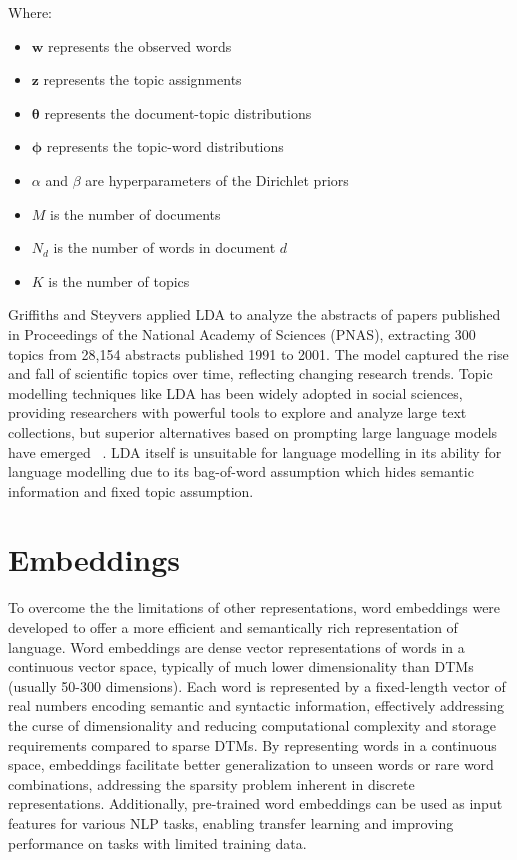 \documentclass[a4paper, oneside]{discothesis}
\begin{document}
Where:
\begin{itemize}
    \item $\mathbf{w}$ represents the observed words
    \item $\mathbf{z}$ represents the topic assignments
    \item $\boldsymbol{\theta}$ represents the document-topic distributions
    \item $\boldsymbol{\phi}$ represents the topic-word distributions
    \item $\alpha$ and $\beta$ are hyperparameters of the Dirichlet priors
    \item $M$ is the number of documents
    \item $N_d$ is the number of words in document $d$
    \item $K$ is the number of topics
\end{itemize}

Griffiths and Steyvers \cite{griffiths2004finding} applied LDA to analyze the abstracts of papers published in Proceedings of the National Academy of Sciences (PNAS), 
extracting 300 topics from 28,154 abstracts published 1991 to 2001. The model captured the rise and fall of scientific topics over time, reflecting changing research trends.
Topic modelling techniques like LDA has been widely adopted in social sciences, providing researchers with powerful tools to explore and analyze large text collections, 
but superior alternatives based on prompting large language models have emerged ~\cite{wang2023promptinglargelanguagemodels}. LDA itself is unsuitable for language modelling  in its
ability for language modelling due to its bag-of-word assumption which hides semantic information and fixed topic assumption.  

\section{Embeddings}

To overcome the the limitations of other representations, word embeddings were developed to offer a more efficient and semantically rich representation of language. Word embeddings are dense vector representations of words in a continuous vector space, typically of much lower dimensionality than DTMs (usually 50-300 dimensions). Each word is represented by a fixed-length vector of real numbers encoding semantic and syntactic information, effectively addressing the curse of dimensionality and reducing computational complexity and storage requirements compared to sparse DTMs. By representing words in a continuous space, embeddings facilitate better generalization to unseen words or rare word combinations, addressing the sparsity problem inherent in discrete representations. Additionally, pre-trained word 
embeddings can be used as input features for various NLP tasks, enabling transfer learning and improving performance on tasks with limited training data. 
\end{document}
